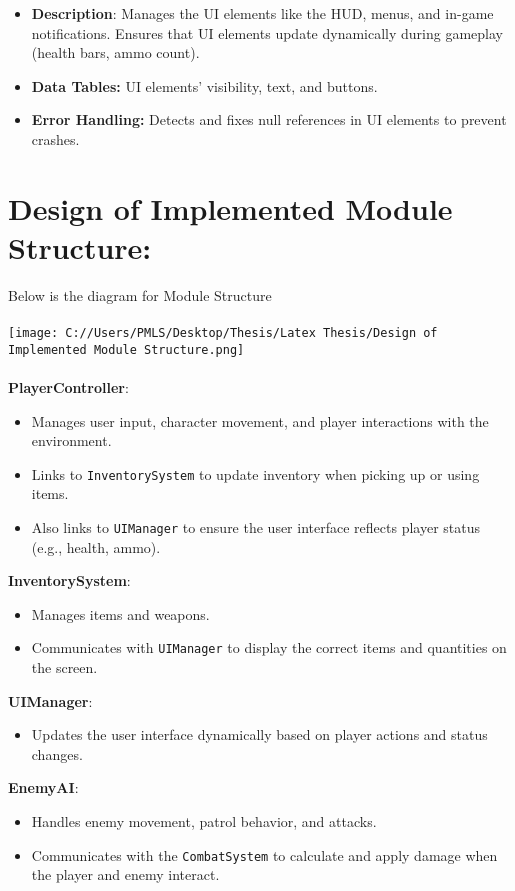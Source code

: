 \begin{itemize}
	\item \textbf{Description}: Manages the UI elements like the HUD, menus, and in-game notifications. Ensures that UI elements update dynamically during gameplay (health bars, ammo count).
	\item \textbf{Data Tables:} UI elements’ visibility, text, and buttons.
	\item \textbf{Error Handling:} Detects and fixes null references in UI elements to prevent crashes.
\end{itemize}

\section{Design of Implemented Module Structure:}
Below is the diagram for Module Structure
\\
\\
\texttt{[image: C://Users/PMLS/Desktop/Thesis/Latex Thesis/Design of Implemented Module Structure.png]}
\\
\\
\textbf{PlayerController}:
\begin{itemize}
	\item Manages user input, character movement, and player interactions with the environment.
	\item Links to \texttt{InventorySystem} to update inventory when picking up or using items.
	\item Also links to \texttt{UIManager} to ensure the user interface reflects player status (e.g., health, ammo).
\end{itemize}

\textbf{InventorySystem}:
\begin{itemize}
	\item Manages items and weapons.
	\item Communicates with \texttt{UIManager} to display the correct items and quantities on the screen.
\end{itemize}

\textbf{UIManager}:
\begin{itemize}
	\item Updates the user interface dynamically based on player actions and status changes.
\end{itemize}

\textbf{EnemyAI}:
\begin{itemize}
	\item Handles enemy movement, patrol behavior, and attacks.
	\item Communicates with the \texttt{CombatSystem} to calculate and apply damage when the player and enemy interact.
\end{itemize}

